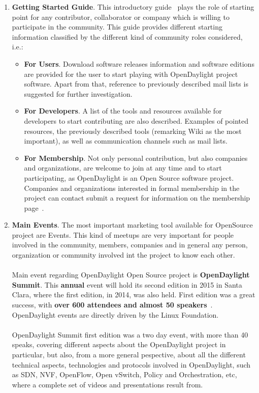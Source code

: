 \documentclass[a4paper, 12pt]{book}
\begin{document}
\begin{enumerate}
\item{\textbf{Getting Started Guide}}. This introductory guide~\cite{OpenDaylightStGuide} plays the role of starting point for any contributor, collaborator or company which is willing to participate in the community. This guide provides different starting information classified by the different kind of community roles considered, i.e.:
\begin{itemize}\itemsep0pt
\item{\textbf{For Users}}. Download software releases information and software editions are provided for the user to start playing with OpenDaylight project software. Apart from that, reference to previously described mail lists is suggested for further investigation.
\item{\textbf{For Developers}}. A list of the tools and resources available for developers to start contributing are also described. Examples of pointed resources, the previously described tools (remarking Wiki as the most important), as well as communication channels such as mail lists.
\item{\textbf{For Membership}}. Not only personal contribution, but also companies and organizations, are welcome  to join at any time and to start participating, as OpenDaylight is an Open Source software project. Companies and organizations interested in formal membership in the project can contact submit a request for information on the membership page~\cite{OpenDaylightJoin}.
\end{itemize}
\item{\textbf{Main Events}}. The most important marketing tool available for OpenSource project are Events. This kind of meetups are very important for people involved in the community, members, companies and in general any person, organization or community involved int the project to know each other.\\
\\
Main event regarding OpenDaylight Open Source project is \textbf{OpenDaylight Summit}. This \textbf{annual} event will hold its second edition in 2015 in Santa Clara, where the first edition, in 2014, was also held. First edition was a great success, with \textbf{over 600 attendees and almost 50 speakers}~\cite{OpenDaylight2014Summit}. OpenDaylight events are directly driven by the Linux Foundation.\\
\\
OpenDaylight Summit first edition was a two day event, with more than 40 speaks, covering different aspects about the OpenDaylight project in particular, but also, from a more general pespective, about all the different technical aspects, technologies and protocols involved in OpenDaylight, such as SDN, NVF, OpenFlow, Open vSwitch, Policy and Orchestration, etc, where a complete set of videos and presentations result from.\\

\end{enumerate}
\end{document}
